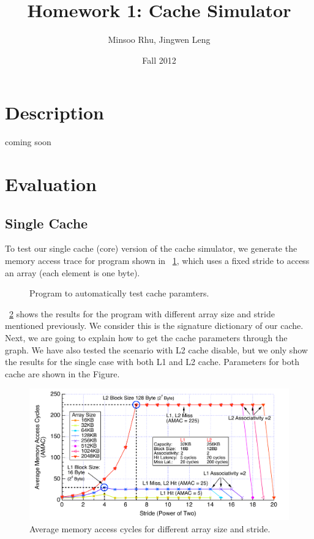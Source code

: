 \documentclass[12pt]{report}
\newcommand{\Fig}[1]{\figurename~\ref{#1}}
\begin{document}

\title{Homework 1: Cache Simulator}
\author{Minsoo Rhu, Jingwen Leng}
\date{Fall 2012}
\maketitle


\section{Description}
 coming soon

\newpage
\section{Evaluation}
\subsection{Single Cache}
To test our single cache (core) version of the cache simulator, we generate the memory access trace for program shown in \Fig{fig:autotest}, which uses a fixed stride to access an array (each element is one byte). 

\begin{figure}[ht]

\caption{Program to automatically test cache paramters.}
\label{fig:autotest}
\end{figure}

\Fig{fig:autotest_result} shows the results for the program with different array size and stride mentioned previously. We consider this is the signature dictionary of our cache. Next, we are going to explain how to get the cache parameters through the graph. We have also tested the scenario with L2 cache disable, but we only show the results for the single case with both L1 and L2 cache. Parameters for both cache are shown in the Figure.

\begin{figure}[!h]
\begin{minipage}[b]{\textwidth}
 \centering
 \includegraphics[trim=0mm 0mm 0mm 0mm,clip,width=\linewidth]{figs/autotest.pdf}
 \caption{Average memory access cycles for different array size and stride.}
 \label{fig:autotest_result}
\end{minipage}
\end{figure}
\end{document}
